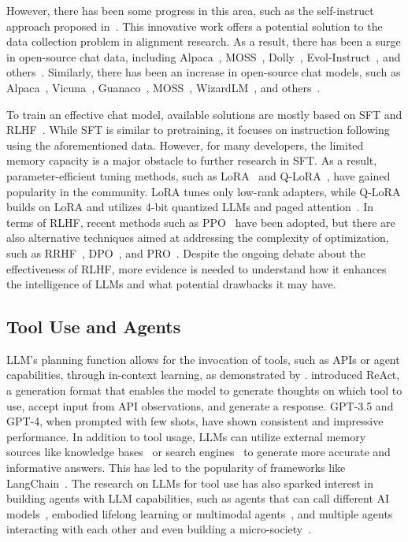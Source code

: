 However, there has been some progress in this area, such as the self-instruct approach proposed in~\cite {self_instruct}. This innovative work offers a potential solution to the data collection problem in alignment research. As a result, there has been a surge in open-source chat data, including Alpaca~\citep{alpaca}, MOSS~\citep{moss}, Dolly~\citep{dolly}, Evol-Instruct~\citep{wizardlm}, and others~\citep{self_align, expertprompting, baize, phoenix, ultrachat, belle, firefly}. Similarly, there has been an increase in open-source chat models, such as Alpaca~\citep{alpaca}, Vicuna~\citep{vicuna}, Guanaco~\citep{qlora}, MOSS~\citep{moss},  WizardLM~\citep{wizardlm}, and others~\citep{baize, phoenix, ultrachat, tulu}.

To train an effective chat model, available solutions are mostly based on SFT and RLHF~\citep{instructgpt}. While SFT is similar to pretraining, it focuses on instruction following using the aforementioned data. However, for many developers, the limited memory capacity is a major obstacle to further research in SFT. As a result, parameter-efficient tuning methods, such as LoRA~\citep{lora} and Q-LoRA~\citep{qlora}, have gained popularity in the community. LoRA tunes only low-rank adapters, while Q-LoRA builds on LoRA and utilizes 4-bit quantized LLMs and paged attention~\citep{bnb, gptq, pageattention}. In terms of RLHF, recent methods such as PPO~\citep{ppo, llama2} have been adopted, but there are also alternative techniques aimed at addressing the complexity of optimization, such as RRHF~\citep{yuan2023rrhf}, DPO~\citep{dpo}, and PRO~\citep{pro}. Despite the ongoing debate about the effectiveness of RLHF, more evidence is needed to understand how it enhances the intelligence of LLMs and what potential drawbacks it may have.

\subsection{Tool Use and Agents} 

LLM's planning function allows for the invocation of tools, such as APIs or agent capabilities, through in-context learning, as demonstrated by \citet{toolformer}. \citet{yao2022react} introduced ReAct, a generation format that enables the model to generate thoughts on which tool to use, accept input from API observations, and generate a response. GPT-3.5 and GPT-4, when prompted with few shots, have shown consistent and impressive performance. In addition to tool usage, LLMs can utilize external memory sources like knowledge bases~\citep{chatdb, memorybank} or search engines~\citep{webgpt, webglm} to generate more accurate and informative answers. This has led to the popularity of frameworks like LangChain~\citep{langchain}. The research on LLMs for tool use has also sparked interest in building agents with LLM capabilities, such as agents that can call different AI models~\citep{hugginggpt, modelscope_agent}, embodied lifelong learning or multimodal agents~\citep{voyager, palm-e}, and multiple agents interacting with each other and even building a micro-society~\citep{agentverse, camel, werewolf, metagpt}.


